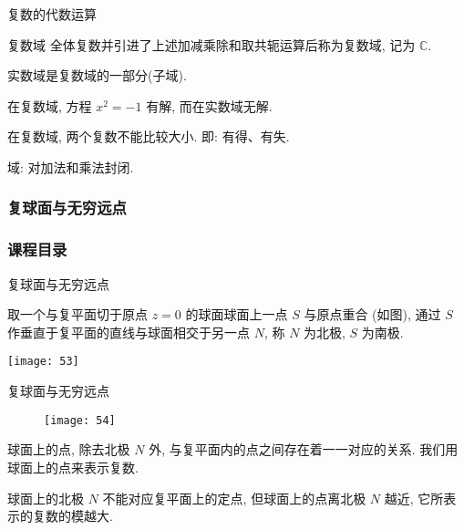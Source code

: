 \documentclass{beamer}
\begin{document}
\begin{frame}{复数的代数运算}
\begin{alertblock}{复数域}
全体复数并引进了上述加减乘除和取共轭运算后称为复数域, 记为 $ \mathbb{C} $.     

实数域是复数域的一部分(子域). 

在复数域, 方程 $ x^2 = - 1 $ 有解, 而在实数域无解. 

在复数域, 两个复数不能比较大小. 即: 有得、有失.     

域: 对加法和乘法封闭. 

\end{alertblock}
\end{frame}



\subsubsection{复球面与无穷远点}

\begin{frame}[t]
\frametitle{课程目录}
\tableofcontents[currentsubsection ] %
\end{frame}

\begin{frame}{复球面与无穷远点}
\begin{minipage}{0.5\linewidth}
取一个与复平面切于原点 $ z =0 $ 的球面球面上一点 $ S $ 与原点重合 (如图),  通过 $ S $ 作垂直于复平面的直线与球面相交于另一点 $ N $,  称 $ N $ 为北极,  $ S $ 为南极.
\end{minipage}\qquad\qquad
\begin{minipage}{0.3\linewidth}
\texttt{[image: 53]}
\end{minipage}
\end{frame}

\begin{frame}{复球面与无穷远点}
\begin{figure}
\texttt{[image: 54]}
\end{figure}
球面上的点,  除去北极 $ N $ 外,  与复平面内的点之间存在着一一对应的关系. 我们用球面上的点来表示复数.

\bigskip

球面上的北极 $ N $ 不能对应复平面上的定点, 但球面上的点离北极 $ N $ 越近, 它所表示的复数的模越大.

\end{frame}
\end{document}
